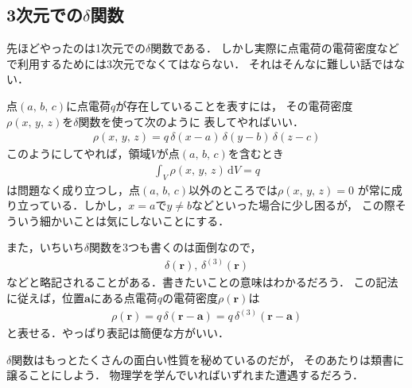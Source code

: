\subsection{3次元での$\delta$関数}
先ほどやったのは1次元での$\delta$関数である．
しかし実際に点電荷の電荷密度などで利用するためには3次元でなくてはならない．
それはそんなに難しい話ではない．

点$( a, \, b, \, c)$に点電荷$q$が存在していることを表すには，
その電荷密度$\rho( x, \, y, \, z)$を$\delta$関数を使って次のように
表してやればいい．
\begin{align}
\rho ( x, \, y, \, z ) = q \, \delta( x -a ) \, \delta ( y-b) \, \delta( z-c)
\label{eq:deltamitudo3d}
\end{align}
このようにしてやれば，領域$V$が点$( a, \, b, \, c)$を含むとき
\begin{align}
\int_V \rho(x, \, y, \, z) \, \mathrm{d} V = q
\label{eq:delta3d}
\end{align}
は問題なく成り立つし，点$(a, \, b, \, c)$以外のところでは$\rho( x, \, y, \, z)=0$
が常に成り立っている．しかし，$x=a$で$y \neq b$などといった場合に少し困るが，
この際そういう細かいことは気にしないことにする．

また，いちいち$\delta$関数を3つも書くのは面倒なので，
\begin{align*}
 \delta ( \bm{r} ) , \, \delta ^{(3)} ( \bm{r})
 \end{align*}
 などと略記されることがある．書きたいことの意味はわかるだろう．
 この記法に従えば，位置$\bm{a}$にある点電荷$q$の電荷密度$\rho(\bm{r})$は
 \begin{align}
 \rho(\bm{r} ) = q \, \delta( \bm{r} - \bm{a} ) = q \, \delta^{(3) } ( \bm{r} - \bm{a})
 \label{eq:ryakkidelta}
 \end{align}
 と表せる．やっぱり表記は簡便な方がいい．
 
 $\delta$関数はもっとたくさんの面白い性質を秘めているのだが，
 そのあたりは類書に譲ることにしよう．
 物理学を学んでいればいずれまた遭遇するだろう．